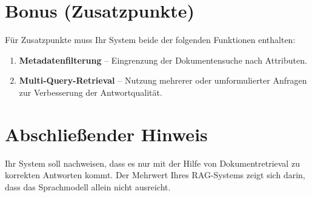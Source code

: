 \documentclass[12pt]{article}
\begin{document}
\section*{Bonus (Zusatzpunkte)}

Für Zusatzpunkte muss Ihr System beide der folgenden Funktionen enthalten:

\begin{enumerate}[label=\arabic*.]
  \item \textbf{Metadatenfilterung} – Eingrenzung der Dokumentensuche nach Attributen.
  \item \textbf{Multi-Query-Retrieval} – Nutzung mehrerer oder umformulierter Anfragen zur Verbesserung der Antwortqualität.
\end{enumerate}

\section*{Abschließender Hinweis}

Ihr System soll nachweisen, dass es nur mit der Hilfe von Dokumentretrieval zu korrekten Antworten kommt. Der Mehrwert Ihres RAG-Systems zeigt sich darin, dass das Sprachmodell allein nicht ausreicht.
\end{document}

